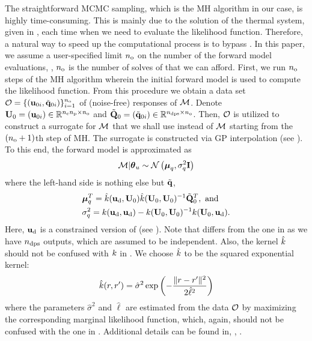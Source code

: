 The straightforward MCMC sampling, which is the MH algorithm in our case, is highly time-consuming. This is mainly due to the solution of the thermal system, given in , each time when we need to evaluate the likelihood function. Therefore, a natural way to speed up the computational process is to bypass . In this paper, we assume a user-specified limit ${n_\text{o}}$ on the number of the forward model evaluations, \ie, ${n_\text{o}}$ is the number of solves of  that we can afford. First, we run ${n_\text{o}}$ steps of the MH algorithm wherein the initial forward model is used to compute the likelihood function. From this procedure we obtain a data set $\mathcal{O} = \{ (\mathbf{u}_{0i}, \tilde{\mathbf{q}}_{0i}) \}_{i = 1}^{n_\text{o}}$ of (noise-free) responses of $\model$. Denote $\mathbf{U}_0 = (\mathbf{u}_{0i}) \in \mathbb{R}^{{n_{\text{c}}} {n_\text{p}} \times {n_\text{o}}}$ and $\tilde{\mathbf{Q}}_0 = (\tilde{\mathbf{q}}_{0i}) \in \mathbb{R}^{{n_\text{dps}} \times {n_\text{o}}}$. Then, $\mathcal{O}$ is utilized to construct a surrogate for $\model$ that we shall use instead of $\model$ starting from the $({n_\text{o}} + 1)$th step of MH. The surrogate is constructed via GP interpolation (see ). To this end, the forward model is approximated as
\begin{equation} \elabel{gp-approximation}
  \model | \vparam_\u \sim \gaussian{\vmean_\T}{\sigma^2_\T \mI}
\end{equation}
where the left-hand side is nothing else but $\tilde{\mathbf{q}}$,
\begin{align}
  & \vmean_\T^T = \hat{\fCov}(\vu_\data, \mU_0) \hat{\fCov}(\mU_0, \mU_0)^{-1} \mmT_0^T, \text{ and} \elabel{gp-mean} \\
  & \sigma^2_\T = \fCov{\vu_\data, \vu_\data} - \fCov{\mU_0, \mU_0}^{-1} \fCov{\mU_0, \vu_\data}. \elabel{gp-variance}
\end{align}
Here, $\mathbf{u}_{\text{d}}$ is a constrained version of  (see ). Note that  differs from the one in  as we have ${n_\text{dps}}$ outputs, which are assumed to be independent. Also, the kernel $\hat{\fCov}$ should not be confused with $\fCov$ in . We choose $\hat{\fCov}$ to be the squared exponential kernel:
\[
  \hat{\fCov}(\r, \r') = \hat{\sigma}^2 \exp\left(-\frac{\norm{\r - \r'}^2}{2 \hat{\ell}^2}\right)
\]
where the parameters $\hat{\sigma}^2$ and $\hat{\ell}$ are estimated from the data $\mathcal{O}$ by maximizing the corresponding marginal likelihood function, which, again, should not be confused with the one in . Additional details can be found in, \eg, \cite{mackay2003, rasmussen2006}.

